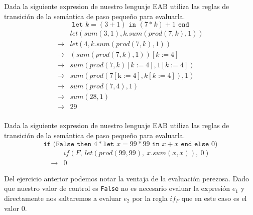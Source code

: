    \begin{exercise}
        Dada la siguiente expresion de nuestro lenguaje \textsf{EAB} utiliza las reglas de transición de la semántica de paso pequeño para evaluarla.
        \[
            \texttt{let } k = (3 + 1) \texttt{ in } (7 * k) + 1 \texttt{ end} 
        \]
        \[
            \begin{array}{cl}
                &\textit{let}(\textit{sum}(3,1), \textit{k}.\textit{sum}(\textit{prod}(7,\textit{k}), 1))\\
                \rightarrow &\textit{let}(4, \textit{k}.\textit{sum}(\textit{prod}(7, \textit{k}), 1))\\
                \rightarrow &(\textit{sum}(\textit{prod}(7, \textit{k}),1))[\textit{k}:=4]\\
                \rightarrow &\textit{sum}(\textit{prod}(7, \textit{k})[\textit{k}:=4],1[\textit{k}:=4])\\
                \rightarrow &\textit{sum}(\textit{prod}(7[\text{k}:=4], \textit{k}[\textit{k}:=4]),1)\\
                \rightarrow &\textit{sum}(\textit{prod}(7, 4), 1)\\
                \rightarrow &\textit{sum}(28, 1)\\
                \rightarrow &29\\
                

            \end{array}
        \]
        
    \end{exercise}


    \begin{exercise}
        Dada la siguiente expresion de nuestro lenguaje \textsf{EAB} utiliza las reglas de transición de la semántica de paso pequeño para evaluarla.
        \[
            \texttt{if (}\texttt{False} \texttt{ then } 4 * \texttt{let } x = 99 * 99 \texttt{ in } x + x \texttt{ end} \texttt{ else } 0 \texttt{)}
        \] 
        \[
            \begin{array}{cl}
                &if(F,\ let(prod(99,99),\ x.sum(x,x)),\ 0)\\
                \rightarrow &0

            \end{array}
        \]
    \end{exercise}

    Del ejercicio anterior podemos notar la ventaja de la evaluación perezosa. Dado que nuestro valor de control es \texttt{False} no es necesario evaluar la expresión $e_1$ y directamente nos saltaremos a evaluar $e_2$ por la regla $if_F$ que en este caso es el valor 0.\\
    
